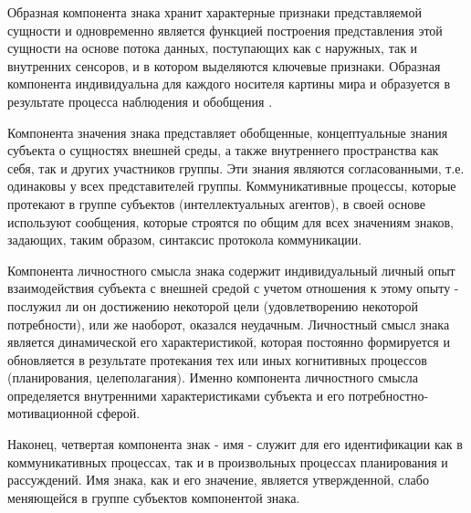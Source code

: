 \documentclass[12pt]{report}
\begin{document}
	Образная компонента знака хранит характерные признаки представляемой сущности и одновременно является функцией построения представления этой сущности на основе потока данных, поступающих как с наружных, так и внутренних сенсоров, и в котором выделяются ключевые признаки. Образная компонента индивидуальна для каждого носителя картины мира и образуется в результате процесса наблюдения и обобщения \cite{Panov2014d,Panov2015c,Skrynnik2016}. 
	
	Компонента значения знака представляет обобщенные, концептуальные знания субъекта о сущностях внешней среды, а также внутреннего пространства как себя, так и других участников группы. Эти знания являются согласованными, т.е. одинаковы у всех представителей группы. Коммуникативные процессы, которые протекают в группе субъектов (интеллектуальных агентов), в своей основе используют сообщения, которые строятся по общим для всех значениям знаков, задающих, таким образом, синтаксис протокола коммуникации.
	
	Компонента личностного смысла знака содержит индивидуальный личный опыт взаимодействия субъекта с внешней средой с учетом отношения к этому опыту - послужил ли он достижению некоторой цели (удовлетворению некоторой потребности), или же наоборот, оказался неудачным. Личностный смысл знака является динамической его характеристикой, которая постоянно формируется и обновляется в результате протекания тех или иных когнитивных процессов (планирования, целеполагания). Именно компонента личностного смысла определяется внутренними характеристиками субъекта и его потребностно-мотивационной сферой.
	
	Наконец, четвертая компонента знак - имя - служит для его идентификации как в коммуникативных процессах, так и в произвольных процессах планирования и рассуждений. Имя знака, как и его значение, является утвержденной, слабо меняющейся в группе субъектов компонентой знака.
	
\end{document}
